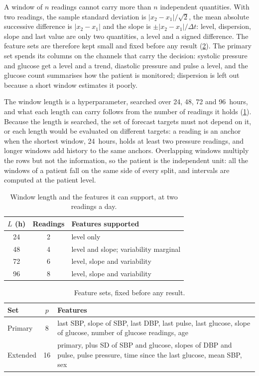 A window of $n$ readings cannot carry more than $n$ independent quantities. With two readings, the sample standard deviation is $\lvert x_2 - x_1\rvert/\sqrt{2}$, the mean absolute successive difference is $\lvert x_2 - x_1\rvert$ and the slope is $\pm\lvert x_2 - x_1\rvert/\Delta t$: level, dispersion, slope and last value are only two quantities, a level and a signed difference. The feature sets are therefore kept small and fixed before any result (\cref{tab:feature-sets}). The primary set spends its columns on the channels that carry the decision: systolic pressure and glucose get a level and a trend, diastolic pressure and pulse a level, and the glucose count summarises how the patient is monitored; dispersion is left out because a short window estimates it poorly.

The window length is a hyperparameter, searched over 24, 48, 72 and 96~hours, and what each length can carry follows from the number of readings it holds (\cref{tab:window-length}). Because the length is searched, the set of forecast targets must not depend on it, or each length would be evaluated on different targets: a reading is an anchor when the shortest window, 24~hours, holds at least two pressure readings, and longer windows add history to the same anchors. Overlapping windows multiply the rows but not the information, so the patient is the independent unit: all the windows of a patient fall on the same side of every split, and intervals are computed at the patient level.

\begin{table}[htbp]
\centering\footnotesize
\caption{Window length and the features it can support, at two readings a day.}\label{tab:window-length}
\begin{tabular}{@{}ccl@{}}
\toprule
\textbf{$L$ (h)} & \textbf{Readings} & \textbf{Features supported} \\
\midrule
24 & 2 & level only \\
48 & 4 & level and slope; variability marginal \\
72 & 6 & level, slope and variability \\
96 & 8 & level, slope and variability \\
\bottomrule
\end{tabular}
\end{table}

\begin{table}[htbp]
\centering\footnotesize
\caption{Feature sets, fixed before any result.}\label{tab:feature-sets}
\begin{tabularx}{\textwidth}{@{}>{\raggedright\arraybackslash}p{2.2cm} c X@{}}
\toprule
\textbf{Set} & \textbf{$p$} & \textbf{Features} \\
\midrule
Primary & 8 & last SBP, slope of SBP, last DBP, last pulse, last glucose, slope of glucose, number of glucose readings, age \\
Extended & 16 & primary, plus SD of SBP and glucose, slopes of DBP and pulse, pulse pressure, time since the last glucose, mean SBP, sex \\
\bottomrule
\end{tabularx}
\end{table}

